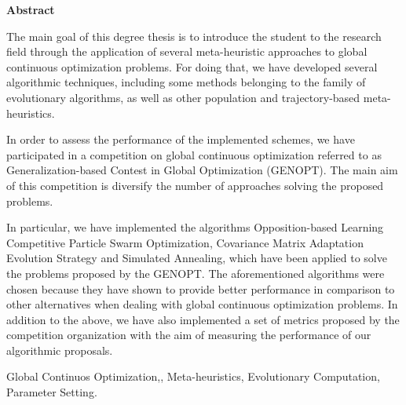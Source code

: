 \documentclass[spanish,a4paper,14pt,oneside]{extreport}
\newenvironment{summary}
{\par\noindent\begin{center}\textbf{Abstract}\end{center}\begin{itshape}\par\noindent}
{\end{itshape}}
\newenvironment{keywords}
{\begin{list}{}{\setlength{\leftmargin}{1em}}\item[\hskip\labelsep \bfseries Keywords:]}
{\end{list}}
\begin{document}
\newpage  %
\begin{summary}
{\em

The main goal of this degree thesis is to introduce the student to the research field through the application of several meta-heuristic approaches to global continuous optimization problems. For doing that, we have developed several algorithmic techniques, including some methods belonging to the family of evolutionary algorithms, as well as other population and trajectory-based meta-heuristics.

In order to assess the performance of the implemented schemes, we have participated in a competition on global continuous optimization referred to as Generalization-based Contest in Global Optimization (GENOPT). The main aim of this competition is diversify the number of approaches solving the proposed problems.

In particular, we have implemented the algorithms Opposition-based Learning Competitive Particle Swarm Optimization, Covariance Matrix Adaptation Evolution Strategy and Simulated Annealing, which have been applied to solve the problems proposed by the GENOPT. The aforementioned algorithms were chosen because they have shown to provide better performance in comparison to other alternatives when dealing with global continuous optimization problems. In addition to the above, we have also implemented a set of metrics proposed by the competition organization with the aim of measuring the performance of our algorithmic proposals.

}

\begin{keywords}
Global Continuos Optimization,, Meta-heuristics, Evolutionary Computation, Parameter Setting.
\end{keywords}

\end{summary}

\newpage{\pagestyle{empty}}
\thispagestyle{empty}



\pagestyle{myheadings} %
\end{document}
